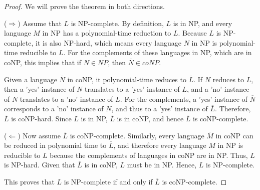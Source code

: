 \documentclass[a4paper,10pt]{article}
\newtheorem{theorem}{Theorem}
\begin{document}
\begin{proof}
We will prove the theorem in both directions.

($\Rightarrow$) Assume that \( L \) is NP-complete. By definition, \( L \) is in NP, and every language \( M \) in NP has a polynomial-time reduction to \( L \). Because \( L \) is NP-complete, it is also NP-hard, which means every language \( N \) in NP is polynomial-time reducible to \( L \). For the complements of these languages in NP, which are in coNP, this implies that if \( N \in NP \), then \( \overline{N} \in coNP \). 

Given a language \( \overline{N} \) in coNP, it polynomial-time reduces to \( \overline{L} \). If \( N \) reduces to \( L \), then a 'yes' instance of \( N \) translates to a 'yes' instance of \( L \), and a 'no' instance of \( N \) translates to a 'no' instance of \( L \). For the complements, a 'yes' instance of \( \overline{N} \) corresponds to a 'no' instance of \( N \), and thus to a 'yes' instance of \( \overline{L} \). Therefore, \( \overline{L} \) is coNP-hard. Since \( L \) is in NP, \( \overline{L} \) is in coNP, and hence \( \overline{L} \) is coNP-complete.

($\Leftarrow$) Now assume \( \overline{L} \) is coNP-complete. Similarly, every language \( \overline{M} \) in coNP can be reduced in polynomial time to \( \overline{L} \), and therefore every language \( M \) in NP is reducible to \( L \) because the complements of languages in coNP are in NP. Thus, \( L \) is NP-hard. Given that \( \overline{L} \) is in coNP, \( L \) must be in NP. Hence, \( L \) is NP-complete.

This proves that \( L \) is NP-complete if and only if \( \overline{L} \) is coNP-complete.
\end{proof}


\end{document}
